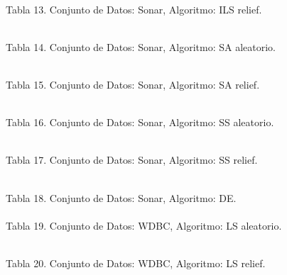 \documentclass{ci5652}
\begin{document}
\begin{adjustbox}{width=\columnwidth, center=\columnwidth}
%
\\
\end{adjustbox}
Tabla 13. Conjunto de Datos: Sonar, Algoritmo: ILS relief.

\begin{adjustbox}{width=\columnwidth, center=\columnwidth}
%
\\
\end{adjustbox}
Tabla 14. Conjunto de Datos: Sonar, Algoritmo: SA aleatorio.

\begin{adjustbox}{width=\columnwidth, center=\columnwidth}
%
\\
\end{adjustbox}
Tabla 15. Conjunto de Datos: Sonar, Algoritmo: SA relief.

%
\\
Tabla 16. Conjunto de Datos: Sonar, Algoritmo: SS aleatorio.

%
\\
Tabla 17. Conjunto de Datos: Sonar, Algoritmo: SS relief.

\begin{adjustbox}{width=\columnwidth, center=\columnwidth}
%
\\
\end{adjustbox}
Tabla 18. Conjunto de Datos: Sonar, Algoritmo: DE.\\

%
\\
Tabla 19. Conjunto de Datos: WDBC, Algoritmo: LS aleatorio.

%
\\
Tabla 20. Conjunto de Datos: WDBC, Algoritmo: LS relief.
\end{document}
